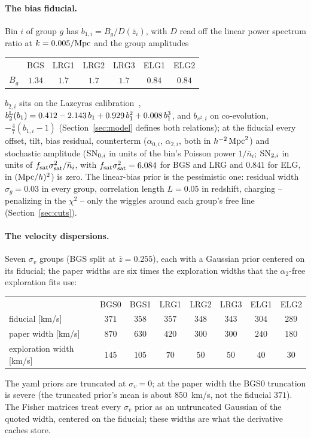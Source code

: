\documentclass[11pt]{article}
\newcommand{\SNzi}{{\rm SN}_{0,i}}
\newcommand{\SNti}{{\rm SN}_{2,i}}
\begin{document}
\paragraph{The bias fiducial.}
Bin $i$ of group $g$ has $b_{1,i} = B_g/D(\bar{z}_i)$, with $D$ read
off the linear power spectrum ratio at $k = 0.005/{\rm Mpc}$ and the
group amplitudes
\begin{center}
  \begin{tabular}{lcccccc}
    \hline
    & BGS & LRG1 & LRG2 & LRG3 & ELG1 & ELG2 \\
    $B_g$ & $1.34$ & $1.7$ & $1.7$ & $1.7$ & $0.84$ & $0.84$ \\
    \hline
  \end{tabular}
\end{center}
$b_{2,i}$ sits on the Lazeyras calibration~\cite{Lazeyras2016},
$b_2^{\rm L}(b_1) = 0.412 - 2.143\,b_1 + 0.929\,b_1^2 + 0.008\,b_1^3$,
and $b_{s^2,i}$ on co-evolution, $-\tfrac{4}{7}(b_{1,i} - 1)$
(Section~\ref{sec:model} defines both relations); at the
fiducial every offset, tilt, bias residual, counterterm
($\alpha_{0,i}$, $\alpha_{2,i}$, both in $h^{-2}\,{\rm Mpc}^2$) and
stochastic amplitude ($\SNzi$ in units of the bin's Poisson power
$1/\bar{n}_i$; $\SNti$ in units of
$f_{\rm sat}\sigma_{\rm sat}^2/\bar{n}_i$, with
$f_{\rm sat}\sigma_{\rm sat}^2 = 6.084$ for BGS and LRG and $0.841$ for
ELG, in $({\rm Mpc}/h)^2$) is zero.  The linear-bias prior is the
pessimistic one: residual width $\sigma_g = 0.03$ in every group,
correlation length $L = 0.05$ in redshift, charging -- penalizing in
the $\chi^2$ -- only the wiggles
around each group's free line (Section~\ref{sec:cuts}).

\paragraph{The velocity dispersions.}
Seven $\sigma_v$ groups (BGS split at $\bar{z} = 0.255$), each with a
Gaussian prior centered on its fiducial; the paper widths are six
times the exploration widths that the $\alpha_2$-free exploration
fits use:
\begin{center}
  \begin{tabular}{lccccccc}
    \hline
    & BGS0 & BGS1 & LRG1 & LRG2 & LRG3 & ELG1 & ELG2 \\
    fiducial [km/s] & $371$ & $358$ & $357$ & $348$ & $343$ & $304$ & $289$ \\
    paper width [km/s] & $870$ & $630$ & $420$ & $300$ & $300$ & $240$ & $180$ \\
    exploration width [km/s] & $145$ & $105$ & $70$ & $50$ & $50$ & $40$ & $30$ \\
    \hline
  \end{tabular}
\end{center}
The yaml priors are truncated at $\sigma_v = 0$; at the paper width
the BGS0 truncation is severe (the truncated prior's mean is about
$850$~km/s, not the fiducial $371$).  The Fisher matrices treat every
$\sigma_v$ prior as an untruncated Gaussian of the quoted width,
centered on the fiducial; these widths are what the derivative caches
store.
\end{document}
